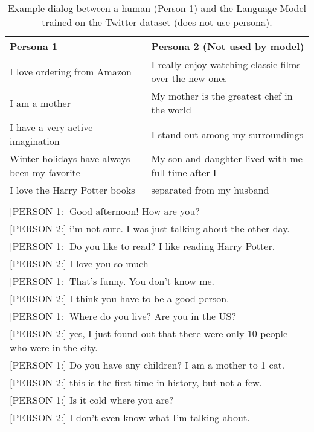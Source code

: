 \documentclass[11pt,a4paper]{article}
\begin{document}
\begin{table*}[t]
  \begin{center}
    \begin{small}
      \begin{tabular}{l|l}
        \toprule
        \textbf{Persona 1} & \textbf{Persona 2 (Not used by model)}\\
     \midrule   
I love ordering from Amazon & I really enjoy watching classic films over the new ones \\ 
I am a mother & My mother is the greatest chef in the world \\
I have a very active imagination & I stand out among my surroundings  \\
Winter holidays have always been my favorite & My son and daughter lived with me full time after I\\
I love the Harry Potter books &  \hspace{2em} separated from my husband\\
\bottomrule
\multicolumn{2}{l}{ }\\
\multicolumn{2}{l}{[PERSON 1:] Good afternoon! How are you?}\\
\multicolumn{2}{l}{[PERSON 2:] i'm not sure. I was just talking about the other day.}\\
\multicolumn{2}{l}{[PERSON 1:] Do you like to read? I like reading Harry Potter. }\\
\multicolumn{2}{l}{[PERSON 2:] I love you so much}\\
\multicolumn{2}{l}{[PERSON 1:] That's funny. You don't know me.}\\
\multicolumn{2}{l}{[PERSON 2:] I think you have to be a good person.}\\
\multicolumn{2}{l}{[PERSON 1:] Where do you live? Are you in the US?}\\
\multicolumn{2}{l}{[PERSON 2:] yes, I just found out that there were only 10 people who were in the city.}\\
\multicolumn{2}{l}{[PERSON 1:] Do you have any children? I am a mother to 1 cat. }\\
\multicolumn{2}{l}{[PERSON 2:] this is the first time in history, but not a few.}\\
\multicolumn{2}{l}{[PERSON 1:] Is it cold where you are?}\\
\multicolumn{2}{l}{[PERSON 2:] I don't even know what I'm talking about.}\\
      \end{tabular}
      \caption{Example dialog between a human (Person 1) and the Language Model trained on the Twitter dataset (does not use persona). \label{table:twitter-example}}
    \end{small}
  \end{center}
\end{table*}
\end{document}
